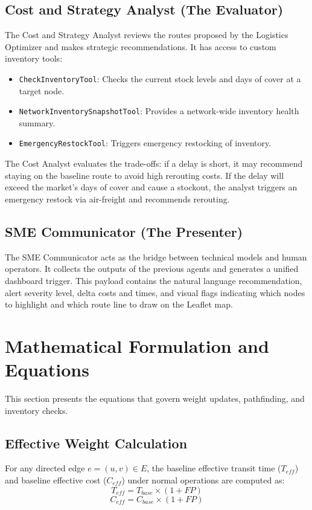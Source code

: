 \subsection{Cost and Strategy Analyst (The Evaluator)}
The Cost and Strategy Analyst reviews the routes proposed by the Logistics Optimizer and makes strategic recommendations. It has access to custom inventory tools:
\begin{itemize}
    \item \texttt{CheckInventoryTool}: Checks the current stock levels and days of cover at a target node.
    \item \texttt{NetworkInventorySnapshotTool}: Provides a network-wide inventory health summary.
    \item \texttt{EmergencyRestockTool}: Triggers emergency restocking of inventory.
\end{itemize}
The Cost Analyst evaluates the trade-offs: if a delay is short, it may recommend staying on the baseline route to avoid high rerouting costs. If the delay will exceed the market's days of cover and cause a stockout, the analyst triggers an emergency restock via air-freight and recommends rerouting.

\subsection{SME Communicator (The Presenter)}
The SME Communicator acts as the bridge between technical models and human operators. It collects the outputs of the previous agents and generates a unified dashboard trigger. This payload contains the natural language recommendation, alert severity level, delta costs and times, and visual flags indicating which nodes to highlight and which route line to draw on the Leaflet map.

\section{Mathematical Formulation and Equations}
This section presents the equations that govern weight updates, pathfinding, and inventory checks.

\subsection{Effective Weight Calculation}
For any directed edge $e = (u, v) \in E$, the baseline effective transit time ($T_{eff}$) and baseline effective cost ($C_{eff}$) under normal operations are computed as:
\begin{equation}
    T_{eff} = T_{base} \times (1 + FP)
\end{equation}
\begin{equation}
    C_{eff} = C_{base} \times (1 + FP)
\end{equation}

